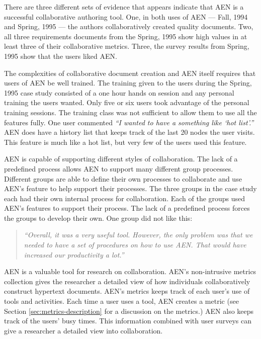 There are three different sets of evidence that appears indicate that AEN
is a successful collaborative authoring tool. One, in both uses of AEN ---
Fall, 1994 and Spring, 1995 --- the authors collaboratively created quality
documents.  Two, all three requirements documents from the Spring, 1995 
show high values in at least three of their collaborative metrics.  Three,
the survey results from Spring, 1995 show that the users liked
AEN.

The complexities of collaborative document creation and AEN itself
requires that users of AEN be well trained.  The training given to the
users during the Spring, 1995 case study consisted of a one hour hands on
session and any personal training the users wanted.  Only five or six users
took advantage of the personal training sessions.  The training class was
not sufficient to allow them to use all the features fully.  One user
commented {\em ``I wanted to have a something like `hot list'.''}  AEN does have
a history list that keeps track of the last 20 nodes the user visits.  This
feature is much like a hot list, but very few of the users used this
feature.

AEN is capable of supporting different styles of collaboration.  The lack
of a predefined process allows AEN to support many different group
processes.  Different groups are able to define their own processes to
collaborate and use AEN's feature to help support their processes.  The
three groups in the case study each had their own internal process for
collaboration.  Each of the groups used AEN's features to support their
process.  The lack of a predefined process forces the groups to develop
their own.  One group did not like this:
\begin{quote}
  {\em 
  ``Overall, it was a very useful tool.  However, the only problem was
  that we needed to have a set of procedures on how to use AEN.  That
  would have increased our productivity a lot.''  
  }
\end{quote}

AEN is a valuable tool for research on collaboration.  AEN's non-intrusive
metrics collection gives the researcher a detailed view of how individuals
collaboratively construct hypertext documents.  AEN's metrics keeps track
of each user's use of tools and activities.  Each time a user uses a tool,
AEN creates a metric (see Section \ref{sec:metrics-description} for a
discussion on the metrics.)  AEN also keeps track of the users' busy times.
This information combined with user surveys can give a researcher a
detailed view into collaboration.


